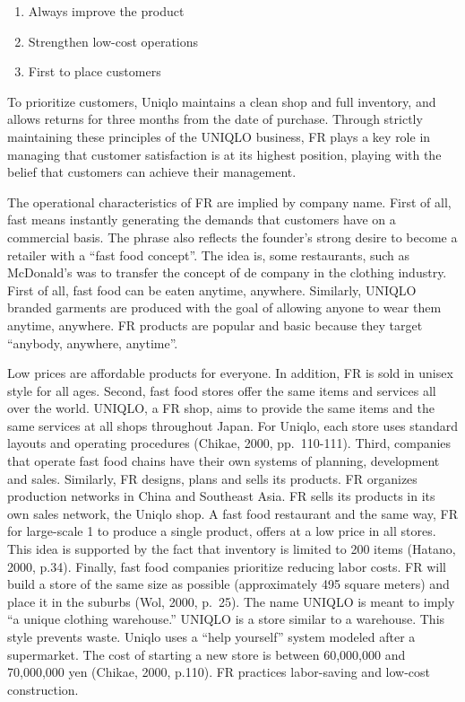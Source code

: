\documentclass[12pt,a4paper]{article}
\providecommand{\tightlist}{%
  \setlength{\itemsep}{0pt}\setlength{\parskip}{0pt}}
\begin{document}
\begin{enumerate}
\def\labelenumi{(\arabic{enumi})}
\tightlist
\item
  Always improve the product
\item
  Strengthen low-cost operations
\item
  First to place customers
\end{enumerate}

To prioritize customers, Uniqlo maintains a clean shop and full
inventory, and allows returns for three months from the date of
purchase. Through strictly maintaining these principles of the UNIQLO
business, FR plays a key role in managing that customer satisfaction is
at its highest position, playing with the belief that customers can
achieve their management.

The operational characteristics of FR are implied by company name. First
of all, fast means instantly generating the demands that customers have
on a commercial basis. The phrase also reflects the founder's strong
desire to become a retailer with a ``fast food concept''. The idea is,
some restaurants, such as McDonald's was to transfer the concept of de
company in the clothing industry. First of all, fast food can be eaten
anytime, anywhere. Similarly, UNIQLO branded garments are produced with
the goal of allowing anyone to wear them anytime, anywhere. FR products
are popular and basic because they target ``anybody, anywhere,
anytime''.

Low prices are affordable products for everyone. In addition, FR is sold
in unisex style for all ages. Second, fast food stores offer the same
items and services all over the world. UNIQLO, a FR shop, aims to
provide the same items and the same services at all shops throughout
Japan. For Uniqlo, each store uses standard layouts and operating
procedures (Chikae, 2000, pp.~110-111). Third, companies that operate
fast food chains have their own systems of planning, development and
sales. Similarly, FR designs, plans and sells its products. FR organizes
production networks in China and Southeast Asia. FR sells its products
in its own sales network, the Uniqlo shop. A fast food restaurant and
the same way, FR for large-scale 1 to produce a single product, offers
at a low price in all stores. This idea is supported by the fact that
inventory is limited to 200 items (Hatano, 2000, p.34). Finally, fast
food companies prioritize reducing labor costs. FR will build a store of
the same size as possible (approximately 495 square meters) and place it
in the suburbs (Wol, 2000, p.~25). The name UNIQLO is meant to imply ``a
unique clothing warehouse.'' UNIQLO is a store similar to a warehouse.
This style prevents waste. Uniqlo uses a ``help yourself'' system
modeled after a supermarket. The cost of starting a new store is between
60,000,000 and 70,000,000 yen (Chikae, 2000, p.110). FR practices
labor-saving and low-cost construction.
\end{document}
